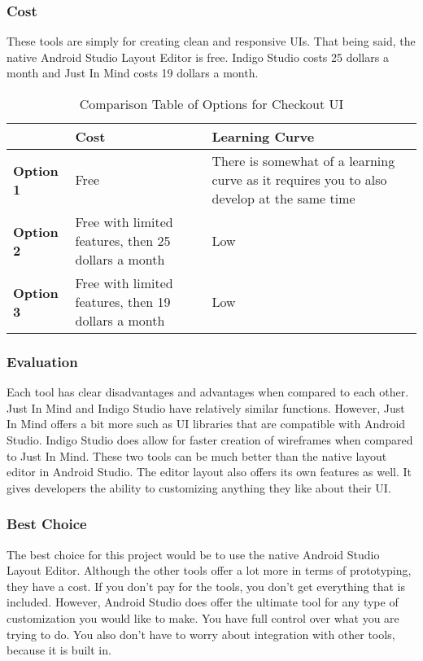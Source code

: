 \documentclass[journal,compsoc, 10pt, draftclsnofoot, onecolumn]{IEEEtran}
\begin{document}
\subsubsection{Cost}
These tools are simply for creating clean and responsive UIs. That being said,
the native Android Studio Layout Editor is free. Indigo Studio costs 25 dollars
a month and Just In Mind costs 19 dollars a month.

\begin{table}[h]
\centering
\caption{Comparison Table of Options for Checkout UI}
\label{my-label}
\begin{tabularx}{\textwidth}{|l|l|X|}
\hline
\textbf{}         & \textbf{Cost}                & \textbf{Learning Curve} \\ \hline
\textbf{Option 1} & Free                                                & There
is somewhat of a learning curve as it requires you to also develop at the same time \\ \hline
\textbf{Option 2} & Free with limited features, then 25 dollars a month & Low \\ \hline
\textbf{Option 3} & Free with limited features, then 19 dollars a month & Low \\ \hline
\end{tabularx}
\end{table}

\subsubsection{Evaluation}
Each tool has clear disadvantages and advantages when compared to each other.
Just In Mind and Indigo Studio have relatively similar functions. However, Just
In Mind offers a bit more such as UI libraries that are compatible with Android
Studio. Indigo Studio does allow for faster creation of wireframes when compared
to Just In Mind. These two tools can be much better than the native layout
editor in Android Studio. The editor layout also offers its own features as
well. It gives developers the ability to customizing anything they like about
their UI.

\subsubsection{Best Choice}
The best choice for this project would be to use the native Android Studio
Layout Editor. Although the other tools offer a lot more in terms of
prototyping, they have a cost. If you don't pay for the tools, you don't get
everything that is included. However, Android Studio does offer the ultimate
tool for any type of customization you would like to make. You have full control
over what you are trying to do. You also don't have to worry about integration
with other tools, because it is built in.
\end{document}
